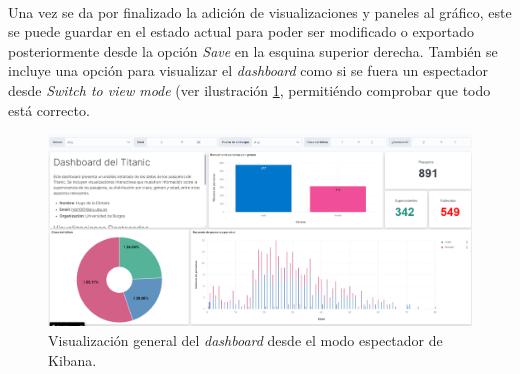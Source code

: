 \paragraph{}
\paragraph{}


Una vez se da por finalizado la adición de visualizaciones y paneles al gráfico, este se puede guardar en el estado actual para poder ser modificado o exportado posteriormente desde la opción \textit{Save} en la esquina superior derecha. También se incluye una opción para visualizar el \textit{dashboard} como si se fuera un espectador desde \textit{Switch to view mode} (ver ilustración \ref{fig:kibana19}, permitiéndo comprobar que todo está correcto.

\begin{figure}
    \centering
    \includegraphics[width=1\linewidth]{img/kibana19.png}
    \caption{Visualización general del \textit{dashboard} desde el modo espectador de Kibana.}
    \label{fig:kibana19}
\end{figure}
